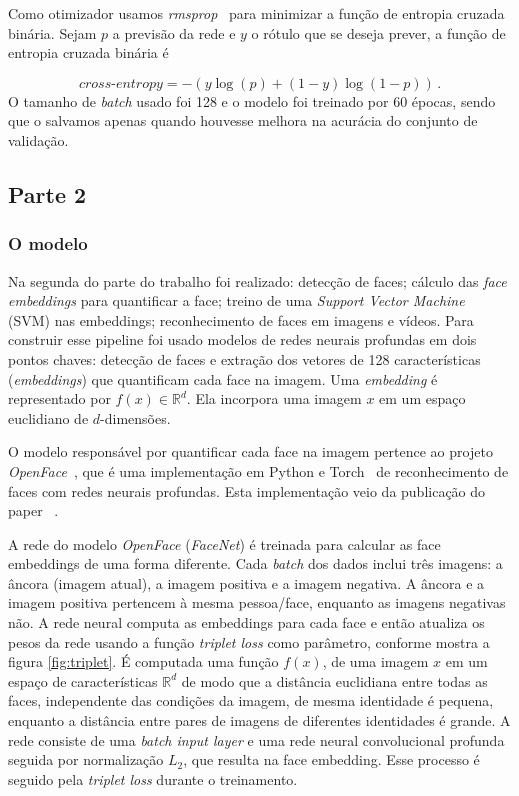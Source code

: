 \documentclass{bmvc2k}
\begin{document}
Como otimizador usamos \textit{rmsprop}~\cite{rmsprop} para minimizar a função de entropia cruzada binária. Sejam $p$ a previsão da rede e $y$ o rótulo que se deseja prever, a função de entropia cruzada binária é

\begin{equation}
    \textit{cross-entropy} = -{(y\log(p) + (1 - y)\log(1 - p))}\,.
\end{equation}
O tamanho de \textit{batch} usado foi 128 e o modelo foi treinado por 60 épocas, sendo que o salvamos apenas quando houvesse melhora na acurácia do conjunto de validação.



\subsection{Parte 2}
\label{pt2}
\subsubsection{O modelo}
Na segunda do parte do trabalho foi realizado: detecção de faces; cálculo das \textit{face embeddings} para quantificar a face; treino de uma \textit{Support Vector Machine}~\cite{hearst1998support} (SVM) nas embeddings; reconhecimento de faces em imagens e vídeos. Para construir esse pipeline foi usado modelos de redes neurais profundas em dois pontos chaves: detecção de faces e extração dos vetores de 128 características (\textit{embeddings}) que quantificam cada face na imagem. Uma \textit{embedding} é representado por $f(x) \in \mathbb{R}^d$. Ela incorpora uma imagem $x$ em um espaço euclidiano de $d$-dimensões.

O modelo responsável por quantificar cada face na imagem pertence ao projeto \textit{OpenFace}~\cite{amos2016openface}, que é uma implementação em Python e Torch~\cite{torch} de reconhecimento de faces com redes neurais profundas. Esta implementação veio da publicação do paper ~\cite{triplet}.

A rede do modelo \textit{OpenFace} (\textit{FaceNet}) é treinada para calcular as face embeddings de uma forma diferente. Cada \textit{batch} dos dados inclui três imagens: a âncora (imagem atual), a imagem positiva e a imagem negativa. A âncora e a imagem positiva pertencem à mesma pessoa/face, enquanto as imagens negativas não. A rede neural computa as embeddings para cada face e então atualiza os pesos da rede usando a função \textit{triplet loss} como parâmetro, conforme mostra a figura \ref{fig:triplet}. É computada uma função $f(x)$, de uma imagem $x$ em um espaço de características $\mathbb{R}^d$ de modo que a distância euclidiana entre todas as faces, independente das condições da imagem, de mesma identidade é pequena, enquanto a distância entre pares de imagens de diferentes identidades é grande. A rede consiste de uma \textit{batch input layer} e uma rede neural convolucional profunda seguida por normalização $L_2$, que resulta na face embedding. Esse processo é seguido pela \textit{triplet loss} durante o treinamento. 	
\end{document}
